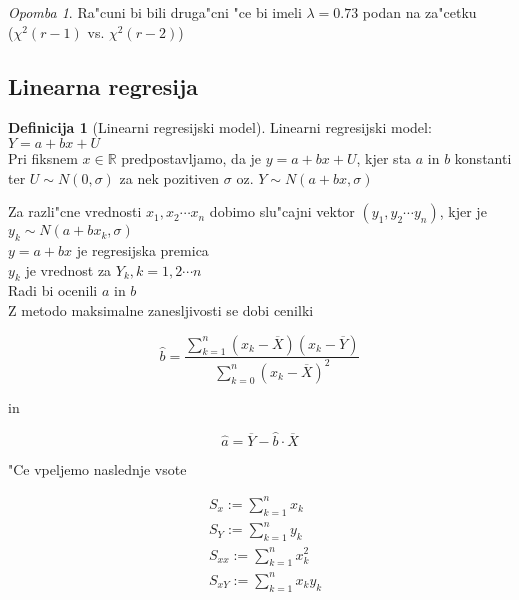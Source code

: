 \documentclass[a4paper,12pt]{article}
\theoremstyle{definition}
\newtheorem{defn}[counter]{Definicija}
\theoremstyle{remark}
\newtheorem*{rem}{Opomba}
\newcommand{\R}{\mathbb{R}}
\begin{document}
\begin{rem}
    Ra"cuni bi bili druga"cni "ce bi imeli $\lambda = 0.73$ podan na za"cetku \\
    ($\chi^2(r-1)$ vs. $\chi^2(r-2)$)
\end{rem}




\subsection{Linearna regresija}

\begin{defn}[Linearni regresijski model]
    Linearni regresijski model: $Y = a + bx + U$ \\
    Pri fiksnem $x \in \R$ predpostavljamo, da je $y = a + bx + U$, kjer sta $a$ in $b$ konstanti ter $U \sim N(0, \sigma)$ za nek
    pozitiven $\sigma$ oz. $Y \sim N(a+bx, \sigma)$
\end{defn}

Za razli"cne vrednosti $x_1, x_2 \cdots x_n$ dobimo slu"cajni vektor $(y_1, y_2 \cdots y_n)$, kjer je $y_k \sim N(a + bx_k, \sigma)$ \\
$y = a + bx$ je regresijska premica \\
$y_k$ je vrednost za $Y_k, k = 1, 2 \cdots n$ \\
Radi bi ocenili $a$ in $b$ \\
Z metodo maksimalne zanesljivosti se dobi cenilki

\begin{equation*}
    \hat{b} = \frac{\sum_{k=1}^{n} (x_k - \overline{X}) (x_k - \overline{Y})}{\sum_{k=0}^{n} (x_k - \overline{X})^2}
\end{equation*}

in

\begin{equation*}
    \hat{a} = \overline{Y} - \hat{b} \cdot \overline{X}
\end{equation*}

"Ce vpeljemo naslednje vsote

\begin{align*}
    &S_x := \sum_{k=1}^{n} x_k \\
    &S_Y := \sum_{k=1}^{n} y_k \\
    &S_{xx} := \sum_{k=1}^{n} x_k^2 \\
    &S_{xY} := \sum_{k=1}^{n} x_k y_k \\
\end{align*}
\end{document}
